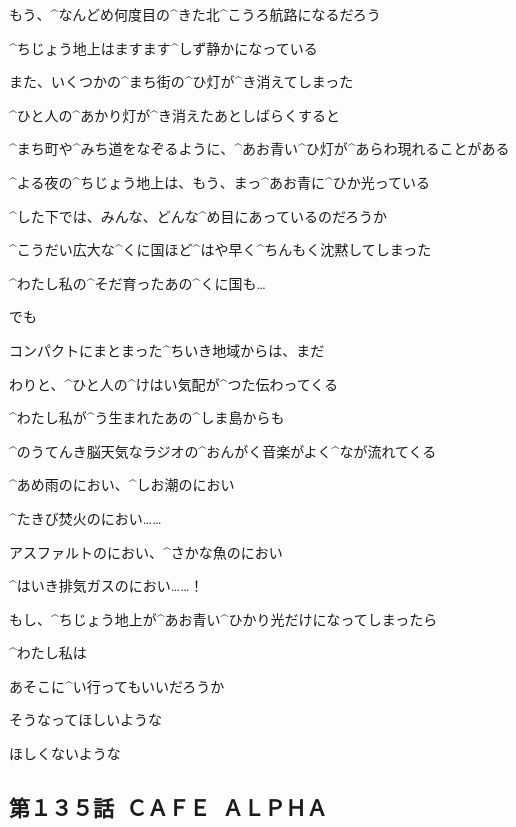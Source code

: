 \page[46]
\ASevenMOne もう、^{なんどめ}{何度目}の^{きた}{北}^{こうろ}{航路}になるだろう

\ASevenMOne ^{ちじょう}{地上}はますます^{しず}{静}かになっている

\page
\ASevenMOne また、いくつかの^{まち}{街}の^{ひ}{灯}が^{き}{消}えてしまった

\ASevenMOne ^{ひと}{人}の^{あかり}{灯}が^{き}{消}えたあとしばらくすると

\ASevenMOne ^{まち}{町}や^{みち}{道}をなぞるように、^{あお}{青}い^{ひ}{灯}が^{あらわ}{現}れることがある

\page
\ASevenMOne ^{よる}{夜}の^{ちじょう}{地上}は、もう、まっ^{あお}{青}に^{ひか}{光}っている

\ASevenMOne ^{した}{下}では、みんな、どんな^{め}{目}にあっているのだろうか

\page
\ASevenMOne ^{こうだい}{広大}な^{くに}{国}ほど^{はや}{早}く^{ちんもく}{沈黙}してしまった

\ASevenMOne ^{わたし}{私}の^{そだ}{育}ったあの^{くに}{国}も…

\ASevenMOne でも

\ASevenMOne コンパクトにまとまった^{ちいき}{地域}からは、まだ

\ASevenMOne わりと、^{ひと}{人}の^{けはい}{気配}が^{つた}{伝}わってくる

\ASevenMOne ^{わたし}{私}が^{う}{生}まれたあの^{しま}{島}からも

\ASevenMOne ^{のうてんき}{脳天気}なラジオの^{おんがく}{音楽}がよく^{なが}{流}れてくる

\page[54]
\ASevenMOne ^{あめ}{雨}のにおい、^{しお}{潮}のにおい

\ASevenMOne ^{たきび}{焚火}のにおい……

\ASevenMOne アスファルトのにおい、^{さかな}{魚}のにおい

\ASevenMOne ^{はいき}{排気}ガスのにおい……！

\page
\ASevenMOne もし、^{ちじょう}{地上}が^{あお}{青}い^{ひかり}{光}だけになってしまったら

\ASevenMOne ^{わたし}{私}は

\ASevenMOne あそこに^{い}{行}ってもいいだろうか

\ASevenMOne そうなってほしいような

\ASevenMOne ほしくないような


\subsection{第１３５話\ ＣＡＦＥ\ ＡＬＰＨＡ}


